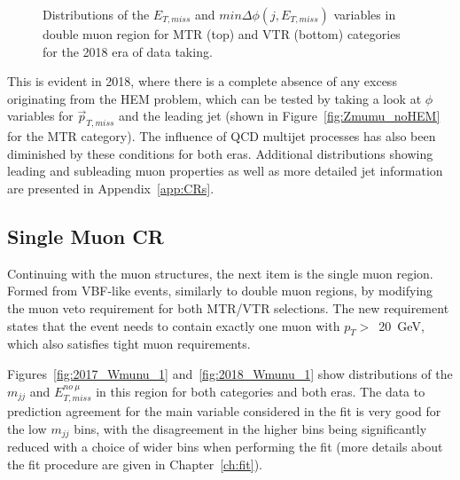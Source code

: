 \begin{figure}[htbp]
{    }
  \caption{Distributions of the $E_{T,miss}$ and $min\Delta\phi(j,E_{T,miss})$ variables in double muon region for MTR (top) and VTR (bottom) categories for the 2018 era of data taking.}
  \label{fig:2018_Zmumu_2}
\end{figure}
\hspace{10pt} This is evident in 2018, where there is a complete absence of any excess originating from the HEM problem, which can be tested by taking a look at $\phi$ variables for $\vec{p}_{T, miss}$ and the leading jet (shown in Figure~\ref{fig:Zmumu_noHEM} for the MTR category). The influence of QCD multijet processes has also been diminished by these conditions for both eras. Additional distributions showing leading and subleading muon properties as well as more detailed jet information are presented in Appendix~\ref{app:CRs}.

\subsection{Single Muon CR}
\label{sec:single_muon}
\hspace{10pt} Continuing with the muon structures, the next item is the single muon region. Formed from VBF-like events, similarly to double muon regions, by modifying the muon veto requirement for both MTR/VTR selections. The new requirement states that the event needs to contain exactly one muon with $p_T>$~20~GeV, which also satisfies tight muon requirements.

\hspace{10pt} Figures~\ref{fig:2017_Wmunu_1} and~\ref{fig:2018_Wmunu_1} show distributions of the $m_{jj}$ and $E_{T,miss}^{no~\mu}$ in this region for both categories and both eras. The data to prediction agreement for the main variable considered in the fit is very good for the low $m_{jj}$ bins, with the disagreement in the higher bins being significantly reduced with a choice of wider bins when performing the fit (more details about the fit procedure are given in Chapter~\ref{ch:fit}).

